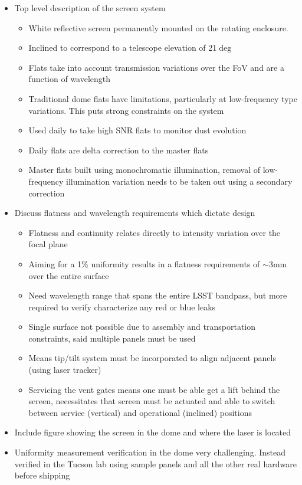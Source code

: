 \begin{itemize} 
	\item 
	Top level description of the screen system
	\begin{itemize}
		\item White reflective screen permanently mounted on the rotating enclosure.
		\item Inclined to correspond to a telescope elevation of 21$\deg$
		\item Flats take into account transmission variations over the FoV and are a function of wavelength
		\item Traditional dome flats have limitations, particularly at low-frequency type variations. This puts strong constraints on the system
		\item Used daily to take high SNR flats to monitor dust evolution
		\item Daily flats are delta correction to the master flats
		\item Master flats built using monochromatic illumination, removal of low-frequency illumination variation needs to be taken out using a secondary correction
	\end{itemize} 
	\item 
	Discuss flatness and wavelength requirements which dictate design
	
	\begin{itemize}
	\item Flatness and continuity relates directly to intensity variation over the focal plane
	\item Aiming for a 1\% uniformity results in a flatness requirements of $\sim$3mm over the entire surface
	\item Need wavelength range that spans the entire LSST bandpass, but more required to verify characterize any red or blue leaks
	\item Single surface not possible due to assembly and transportation constraints, said multiple panels must be used
	\item Means tip/tilt system must be incorporated to align adjacent panels (using laser tracker)
	\item Servicing the vent gates means one must be able get a lift behind the screen, necessitates that screen must be actuated and able to switch between service (vertical) and operational (inclined) positions
	\end{itemize} 	

	\item Include figure showing the screen in the dome and where the laser is located
	\item Uniformity measurement verification in the dome very challenging. Instead verified in the Tucson lab using sample panels and all the other real hardware before shipping

\end{itemize}

